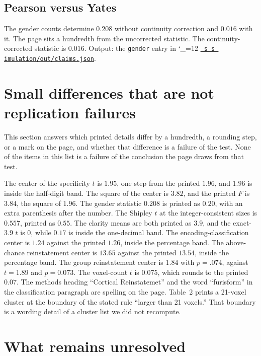 \documentclass[11pt]{article}
\makeatletter
\def\ogm@show#1{%
  \ifx\relax#1\else
    #1\allowbreak
    \expandafter\ogm@show
  \fi}
\newcommand{\src}{\begingroup\catcode`\_=12 \ogm@src}
\newcommand{\ogm@src}[1]{%
  \edef\srcurl{https://github.com/alectionary/vibe-math/blob/master/formalization/overgeneral-memory/#1}%
  \href{\srcurl}{\texttt{\ogm@show#1\relax}}\endgroup}
\makeatother
\begin{document}
\subsection{Pearson versus Yates}

The gender counts determine \(0.208\) without continuity correction and
\(0.016\) with it.
The page sits a hundredth from the uncorrected statistic.
The continuity-corrected statistic is \(0.016\).
Output: the \texttt{gender} entry in \src{simulation/out/claims.json}.

\section{Small differences that are not replication failures}
\label{sec:small}

This section answers which printed details differ by a hundredth, a
rounding step, or a mark on the page, and whether that difference is a
failure of the test.
None of the items in this list is a failure of the conclusion the page
draws from that test.

The center of the specificity \(t\) is \(1.95\), one step from the printed
\(1.96\), and \(1.96\) is inside the half-digit band.
The square of the center is \(3.82\), and the printed \(F\) is \(3.84\), the
square of \(1.96\).
The gender statistic \(0.208\) is printed as \(0.20\), with an extra
parenthesis after the number.
The Shipley \(t\) at the integer-consistent sizes is \(0.557\), printed as
\(0.55\).
The clarity means are both printed as \(3.9\), and the exact-\(3.9\) \(t\) is
0, while \(0.17\) is inside the one-decimal band.
The encoding-classification center is \(1.24\) against the printed \(1.26\),
inside the percentage band.
The above-chance reinstatement center is \(13.65\) against the printed
\(13.54\), inside the percentage band.
The group reinstatement center is \(1.84\) with \(p = .074\), against
\(t = 1.89\) and \(p = 0.073\).
The voxel-count \(t\) is \(0.075\), which rounds to the printed \(0.07\).
The methods heading ``Cortical Reinstatemet'' and the word ``furisform'' in
the classification paragraph are spelling on the page.
Table~2 prints a 21-voxel cluster at the boundary of the stated rule
``larger than 21 voxels.''
That boundary is a wording detail of a cluster list we did not recompute.

\section{What remains unresolved}
\label{sec:open}
\end{document}
